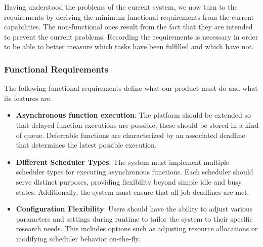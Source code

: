 Having understood the problems of the current system, we now turn to the requirements by deriving the minimum functional requirements from the current capabilities. The non-functional ones result from the fact that they are intended to prevent the current problems. Recording the requirements is necessary in order to be able to better measure which tasks have been fulfilled and which have not.

\subsubsection{Functional Requirements}
\label{sec:functional-req}
The following functional requirements define what our product must do and what its features are.
\begin{itemize}
    \item \textbf{Asynchronous function execution}: The platform should be extended so that delayed function executions are possible; these should be stored in a kind of queue. Deferrable functions are characterized by an associated deadline that determines the latest possible execution. 

     \item \textbf{Different Scheduler Types}: The system must implement multiple scheduler types for executing asynchronous functions. Each scheduler should serve distinct purposes, providing flexibility beyond simple idle and busy states. Additionally, the system must ensure that all job deadlines are met.

    \item \textbf{Configuration Flexibility}: Users should have the ability to adjust various parameters and settings during runtime to tailor the system to their specific research needs. This includes options such as adjusting resource allocations or modifying scheduler behavior on-the-fly.
    
\end{itemize}

